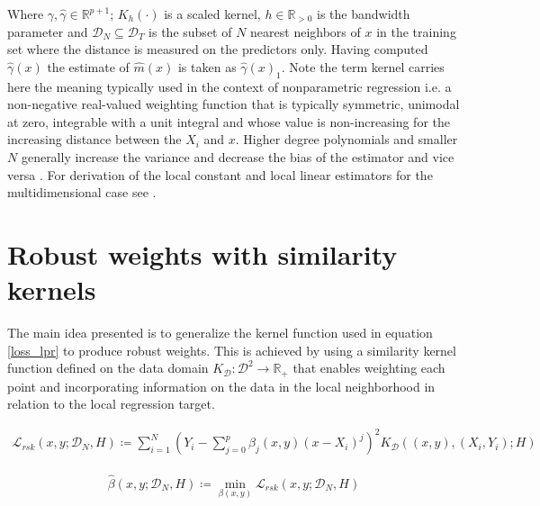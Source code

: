 \documentclass[preprint,1p,times]{elsarticle}
\begin{document}
Where $\gamma, \hat{\gamma} \in \mathbb{R}^{p+1}$; $K_h(\cdot)$ is a scaled kernel, $h \in \mathbb{R}_{> 0}$ is the bandwidth parameter and $\mathcal{D}_N \subseteq \mathcal{D}_T$ is the subset of $N$ nearest neighbors of $x$ in the training set where the distance is measured on the predictors only. Having computed $\hat{\gamma}(x)$ the estimate of $\hat{m}(x)$ is taken as $\hat{\gamma}(x)_1$. Note the term kernel carries here the meaning typically used in the context of nonparametric regression i.e. a non-negative real-valued weighting function that is typically symmetric, unimodal at zero, integrable with a unit integral and whose value is non-increasing for the increasing distance between the $X_i$ and $x$. Higher degree polynomials and smaller $N$ generally increase the variance and decrease the bias of the estimator and vice versa \citep{Avery2010LiteratureRF}. For derivation of the local constant and local linear estimators for the multidimensional case see \citep{Garcia-Portugues2023}.

\section{Robust weights with similarity kernels}
\label{S:Robust weights with similarity kernels}
The main idea presented is to generalize the kernel function used in equation \eqref{loss_lpr} to produce robust weights. This is achieved by using a similarity kernel function defined on the data domain $K_{\mathcal{D}}:\mathcal{D}^2 \rightarrow \mathbb{R}_+$ that enables weighting each point and incorporating information on the data in the local neighborhood in relation to the local regression target. 

\begin{align}
\mathcal{L}_{rsk}(x, y; \mathcal{D}_N , H) \coloneqq \sum_{i=1}^N \left(  Y_i - \sum_{j=0}^p \beta_j (x, y) (x - X_i)^j \right)^2 K_{\mathcal{D}} \left((x,y),(X_i, Y_i); H \right)
\label{loss_rsk}
\end{align}

\begin{align}
\hat{\beta}(x,y ; \mathcal{D}_N, H ) \coloneqq \min_{\beta(x,y)} \mathcal{L}_{rsk}(x, y; \mathcal{D}_N , H) 
\label{beta_loss_d}
\end{align}
\end{document}
